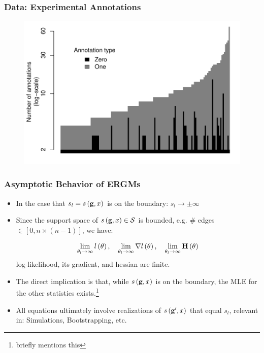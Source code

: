 \documentclass[aspectratio=169, 9pt, handout]{beamer}
\begin{document}
\begin{frame}
	\frametitle{Data: Experimental Annotations}
	\begin{figure}
		\centering
		\includegraphics[width=.7\linewidth]{distribution-annotation-type.pdf}
	\end{figure}
\end{frame}

\begin{frame}[label=discrete-exponential-theory]
	\frametitle{Asymptotic Behavior of ERGMs}
	
	\begin{itemize}
		\item In the case that $s_l = s\left(\mathbf{g}, x\right)$ is on the boundary: $s_l \to \pm\infty$\pause
		\item Since the support space of $s\left(\mathbf{g}, x\right)\in\mathcal{S}$ is bounded, e.g. \# edges $\in [0,n\times (n - 1)]$, we have: \pause
		
		\begin{equation*}
		\lim_{\theta_l\to\infty}\loglik{\theta}, \quad %
		\lim_{\theta_l\to\infty}\nabla\loglik{\theta}, \quad %
		\lim_{\theta_l\to\infty}\mathbf{H}\left(\theta\right)
		\end{equation*}
		log-likelihood, its gradient, and hessian are finite.\pause
		\item The direct implication is that, while $s\left(\mathbf{g}, x\right)$ is on the boundary, the MLE for the other statistics exists.\footnote{\cite{Handcock2003} briefly mentions this}\pause
		\item All equations ultimately involve realizations of $s\left(\mathbf{g}', x\right)$ that equal $s_l$, relevant in: Simulations, Bootstrapping, etc.
	\end{itemize}
	
	\vfill\hfill\hyperlink{discrete-exponential}{}
	
\end{frame}
\end{document}
